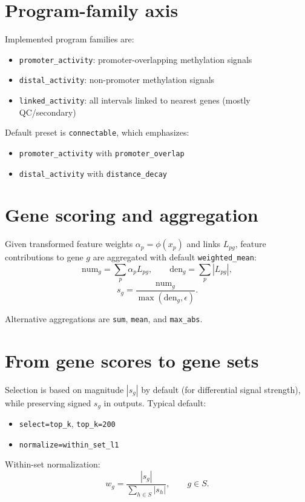\documentclass[11pt]{article}
\begin{document}
\section{Program-family axis}
Implemented program families are:
\begin{itemize}[leftmargin=2em]
\item \texttt{promoter\_activity}: promoter-overlapping methylation signals
\item \texttt{distal\_activity}: non-promoter methylation signals
\item \texttt{linked\_activity}: all intervals linked to nearest genes (mostly QC/secondary)
\end{itemize}

Default preset is \texttt{connectable}, which emphasizes:
\begin{itemize}[leftmargin=2em]
\item \texttt{promoter\_activity} with \texttt{promoter\_overlap}
\item \texttt{distal\_activity} with \texttt{distance\_decay}
\end{itemize}

\section{Gene scoring and aggregation}
Given transformed feature weights $\alpha_p = \phi(x_p)$ and links $L_{pg}$,
feature contributions to gene $g$ are aggregated with default \texttt{weighted\_mean}:
\[
\text{num}_g = \sum_p \alpha_p L_{pg}, \qquad
\text{den}_g = \sum_p |L_{pg}|,
\]
\[
s_g = \frac{\text{num}_g}{\max(\text{den}_g, \epsilon)}.
\]

Alternative aggregations are \texttt{sum}, \texttt{mean}, and \texttt{max\_abs}.

\section{From gene scores to gene sets}
Selection is based on magnitude $|s_g|$ by default (for differential signal strength), while preserving signed $s_g$ in outputs.
Typical default:
\begin{itemize}[leftmargin=2em]
\item \texttt{select=top\_k}, \texttt{top\_k=200}
\item \texttt{normalize=within\_set\_l1}
\end{itemize}

Within-set normalization:
\[
w_g = \frac{|s_g|}{\sum_{h\in S} |s_h|}, \qquad g \in S.
\]
\end{document}
